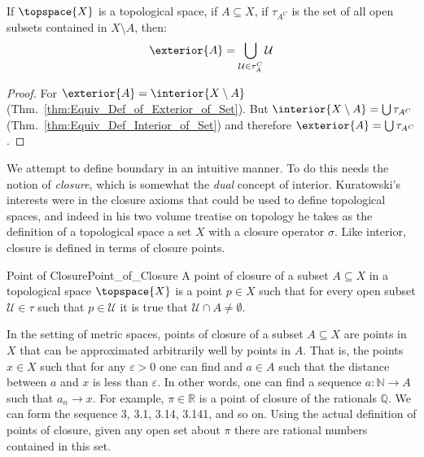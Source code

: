         \begin{theorem}
            \label{thm:Alt_Equiv_Def_Exterior_of_Set}%
            If $\topspace{X}$ is a topological space, if $A\subseteq{X}$, if
            $\tau_{A^{C}}$ is the set of all open subsets contained in
            $X\setminus{A}$, then:
            \begin{equation}
                \exterior{A}=\bigcup_{\mathcal{U}\in\tau_{A}^{C}}\mathcal{U}
            \end{equation}
        \end{theorem}
        \begin{proof}
            For $\exterior{A}=\interior{X\setminus{A}}$
            (Thm.~\ref{thm:Equiv_Def_of_Exterior_of_Set}). But
            $\interior{X\setminus{A}}=\bigcup\tau_{A^{C}}$
            (Thm.~\ref{thm:Equiv_Def_Interior_of_Set}) and therefore
            $\exterior{A}=\bigcup\tau_{A^{C}}$.
        \end{proof}
        We attempt to define boundary in an intuitive manner. To do this
        needs the notion of \textit{closure}, which is somewhat the
        \textit{dual} concept of interior. Kuratowski's interests were in
        the closure axioms that could be used to define topological spaces,
        and indeed in his two volume treatise on topology he takes as the
        definition of a topological space a set $X$ with a closure operator
        $\sigma$. Like interior, closure is defined in terms of closure
        points.
        \begin{fdefinition}{Point of Closure}{Point_of_Closure}
            A point of closure of a subset $A\subseteq{X}$ in a topological
            space $\topspace{X}$ is a point $p\in{X}$ such that for every
            open subset $\mathcal{U}\in\tau$ such that $p\in\mathcal{U}$ it
            is true that $\mathcal{U}\cap{A}\ne\emptyset$.
        \end{fdefinition}
        \begin{example}
            In the setting of metric spaces, points of closure of a subset
            $A\subseteq{X}$ are points in $X$ that can be approximated
            arbitrarily well by points in $A$. That is, the points $x\in{X}$
            such that for any $\varepsilon>0$ one can find and $a\in{A}$
            such that the distance between $a$ and $x$ is less than
            $\varepsilon$. In other words, one can find a sequence
            $a:\mathbb{N}\rightarrow{A}$ such that $a_{n}\rightarrow{x}$.
            For example, $\pi\in\mathbb{R}$ is a point of closure of the
            rationals $\mathbb{Q}$. We can form the sequence 3, 3.1, 3.14,
            3.141, and so on. Using the actual definition of points of
            closure, given any open set about $\pi$ there are rational
            numbers contained in this set.
        \end{example}
